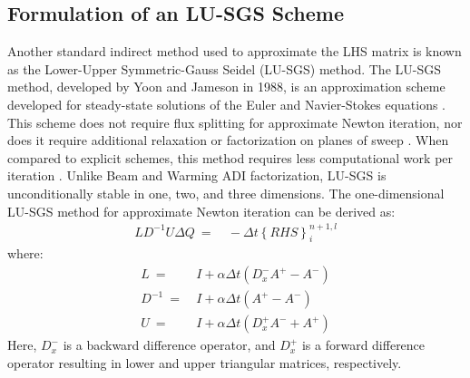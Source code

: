\documentclass[conf]{new-aiaa}
\begin{document}
\subsection{Formulation of an LU-SGS Scheme}
Another standard indirect method used to approximate the LHS matrix is known as the Lower-Upper Symmetric-Gauss Seidel (LU-SGS) method. 
The LU-SGS method, developed by Yoon and Jameson in 1988, is an approximation scheme developed for steady-state solutions of the Euler and Navier-Stokes equations \cite{LUSGS}. 
This scheme does not require flux splitting for approximate Newton iteration, nor does it require additional relaxation or factorization on planes of sweep \cite{LUSGS}. 
When compared to explicit schemes, this method requires less computational work per iteration \cite{YoonLUSGS}. 
Unlike Beam and Warming \cite{Beam} ADI factorization, LU-SGS is unconditionally stable in one, two, and three dimensions.
The one-dimensional LU-SGS method for approximate Newton iteration can be derived as:
\begin{equation}
	\begin{split}
	\label{eq:LSGSUFinal}
		LD^{-1}U\Delta{Q}~=&~-\Delta{t}\left\{RHS\right\}^{n+1, l}_i
	\end{split}
\end{equation}
where:
\begin{equation}
	\begin{split}
            L~=&~I + \alpha\Delta{t}\left(D_x^-A^+-A^-\right)\\
		D^{-1}~=&~I + \alpha\Delta{t}\left(A^+-A^-\right) \\
		U~=&~I + \alpha\Delta{t}\left(D_x^+A^-+A^+\right)
	\end{split}
\end{equation}
Here, $D_x^-$ is a backward difference operator, and $D_x^+$ is a forward difference operator resulting in lower and upper triangular matrices, respectively.  
\end{document}
